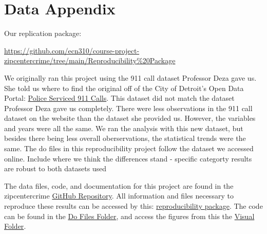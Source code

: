 \documentclass[12pt]{article}
\begin{document}
 

\newpage
\singlespacing
\setlength\bibsep{0pt}





\newpage
\section*{Data Appendix} \label{sec:appendixa}

Our replication package:

\href{https://github.com/ecn310/course-project-zipcentercrime/tree/main/Reproducibility%20Package}{https://github.com/ecn310/course-project-zipcentercrime/tree/main/Reproducibility\%20Package}

\vspace{10pt}


We originally ran this project using the 911 call dataset Professor Deza gave us. She told us where to find the original off of the City of Detroit's Open Data Portal: \href{https://data.detroitmi.gov/datasets/detroitmi::police-serviced-911-calls/about}{Police Serviced 911 Calls}. This dataset did not match the dataset Professor Deza gave us completely. There were less observations in the 911 call dataset on the website than the dataset she provided us. However, the variables and years were all the same. We ran the analysis with this new dataset, but besides there being less overall oberservations, the statistical trends were the same. The do files in this reproducibility project follow the dataset we accessed online.
Include where we think the differences stand - specific categorty 
results are robust to both datasets used 

The data files, code, and documentation for this project are found in the zipcentercrime \href{https://github.com/ecn310/course-project-zipcentercrime}{GitHub Repository}. All information and files necessary to reproduce these results can be accessed by this: \href{https://github.com/ecn310/course-project-zipcentercrime/tree/main/Reproducibility%20Package}{reproducibility package}. The code can be found in the \href{https://github.com/ecn310/course-project-zipcentercrime/tree/main/Reproducibility%20Package/Do%20files}{Do Files Folder}, and access the figures from this the \href{https://github.com/ecn310/course-project-zipcentercrime/tree/main/Reproducibility%20Package/Visual%20Graphics}{Visual Folder}. 
\end{document}
